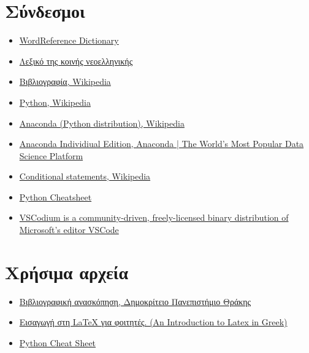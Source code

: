\documentclass[a4paper,14pt]{extreport}
\begin{document}
\section{Σύνδεσμοι}
\begin{itemize}
    \item \href{https://tinyurl.com/yyzfa2bg}{WordReference Dictionary}
    \item\href{https://tinyurl.com/o5vxal7}{Λεξικό της κοινής νεοελληνικής}
    \item \href{https://tinyurl.com/y9q2elk4}{Βιβλιογραφία, Wikipedia}
    \item \href{https://tinyurl.com/y9g9nkh2}{Python, Wikipedia}
    \item \href{https://tinyurl.com/ycy6jsw5}{Anaconda (Python distribution),
              Wikipedia}
    \item \href{https://tinyurl.com/y7rogsec}{Anaconda Individiual Edition,
              Anaconda | The World's Most Popular Data Science Platform}
    \item \href{https://tinyurl.com/ogoqf2p}{Conditional statements, Wikipedia}
    \item \href{https://tinyurl.com/y8y59y44}{Python Cheatsheet}
    \item \href{https://tinyurl.com/y54gclet}{VSCodium is a community-driven,
              freely-licensed binary distribution of Microsoft’s editor VSCode}
\end{itemize}
\section{Χρήσιμα αρχεία}
\begin{itemize}
    \item \href{https://tinyurl.com/y9l8o5n6}{Βιβλιογραφική ανασκόπηση,
              Δημοκρίτειο Πανεπιστήμιο Θράκης}
    \item \href{https://tinyurl.com/yaaswz5p}{Εισαγωγή στη LaTeX για φοιτητές.
              (An Introduction to Latex in Greek)}
    \item \href{https://tinyurl.com/nqbrvss}{Python Cheat Sheet}
\end{itemize}
\end{document}
